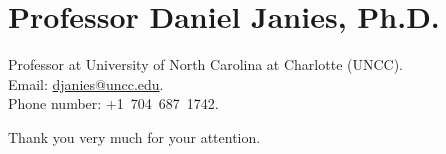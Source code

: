\documentclass[12pt, a4paper, roman, twoside]{moderncv}        %
\begin{document}
\section{Professor Daniel Janies, Ph.D.}
    {\begin{changemargin}{0.5cm}{0.5cm}{\small
    Professor at University of North Carolina at Charlotte (UNCC).\\
    Email: \href{mailto:djanies@uncc.edu}{djanies@uncc.edu}.\\
    Phone number: +1~704~687~1742.\\
    }\end{changemargin}}
%
Thank you very much for your attention.\\
%
\makeletterclosing
%
\end{document}
